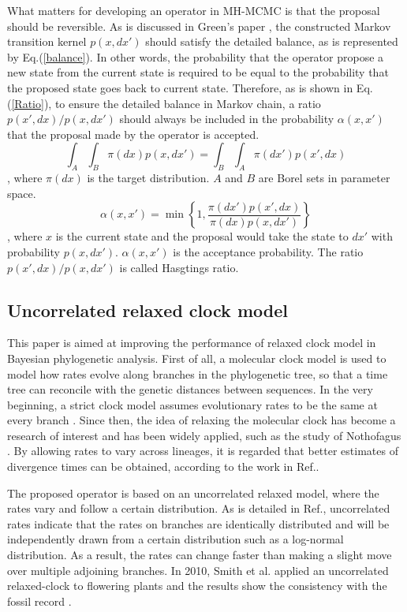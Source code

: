 \documentclass{bmcart}
\begin{document}
What matters for developing an operator in MH-MCMC is that the proposal should be reversible. As is discussed in Green's paper \cite{green1995reversible}, the constructed Markov transition kernel $p(x,dx')$ should satisfy the detailed balance, as is represented by Eq.(\ref{balance}). In other words, the probability that the operator propose a new state from the current state is required to be equal to the probability that the proposed state goes back to current state. Therefore, as is shown in Eq.(\ref{Ratio}), to ensure the detailed balance in Markov chain, a ratio ${p(x',dx)}/{p(x,dx')}$ should always be included in the probability $\alpha(x,x')$ that the proposal made by the operator is accepted.
\begin{equation}\label{balance}
\int_A {\int_B {\pi (dx)p(x,dx')} }  = \int_B {\int_A {\pi (dx')p(x',dx)} }
\end{equation}
, where ${\pi (dx)}$ is the target distribution. $A$ and $B$ are Borel sets in parameter space.
\begin{equation}\label{Ratio}
{\alpha}(x,x') = \min \left\{ {1,\frac{{\pi (dx'){p}(x',dx)}}{{\pi (dx){p}(x,dx')}}} \right\}
\end{equation}
, where $x$ is the current state and the proposal would take the state to $dx'$ with probability ${p(x,dx')}$. ${\alpha}(x,x')$ is the acceptance probability. The ratio ${p(x',dx)}/{p(x,dx')}$ is called Hasgtings ratio.
\subsection*{Uncorrelated relaxed clock model}
This paper is aimed at improving the performance of relaxed clock model in Bayesian phylogenetic analysis. First of all, a molecular clock model is used to model how rates evolve along branches in the phylogenetic tree, so that a time tree can reconcile with the genetic distances between sequences. In the very beginning, a strict clock model assumes evolutionary rates to be the same at every branch \cite{zuckerkandl1965evolutionary}. Since then, the idea of relaxing the molecular clock has become a research of interest and has been widely applied, such as the study of Nothofagus \cite{knapp2005relaxed}. By allowing rates to vary across lineages, it is regarded that better estimates of divergence times can be obtained, according to the work in Ref.\cite{ho2005accuracy,renner2005relaxed,lepage2007general}. 

 The proposed operator is based on an uncorrelated relaxed model, where the rates vary and follow a certain distribution. As is detailed in Ref.\cite{drummond2006relaxed}, uncorrelated rates indicate that the rates on branches are identically distributed and will be independently drawn from a certain distribution such as a log-normal distribution. As a result, the rates can change faster than making a slight move over multiple adjoining branches. In 2010, Smith et al. applied an uncorrelated relaxed-clock to flowering plants and the results show the consistency with the fossil record \cite{smith2010uncorrelated}.
\end{document}
